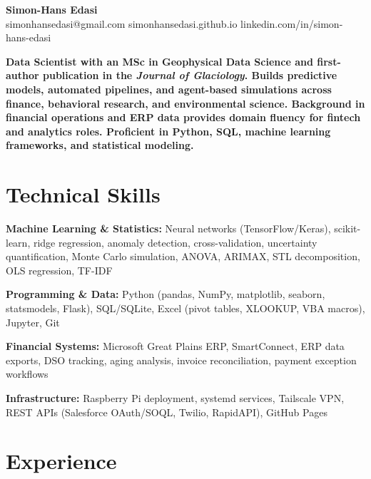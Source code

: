\documentclass[11pt,a4paper]{article}
\begin{document}
\begin{center}
    {\LARGE \textbf{Simon-Hans Edasi}} \\[6pt]
    simonhansedasi@gmail.com \hfill \textbar \hfill
    simonhansedasi.github.io \hfill \textbar \hfill
    linkedin.com/in/simon-hans-edasi
\end{center}

\vspace{0.3cm}

\noindent
\textbf{Data Scientist with an MSc in Geophysical Data Science and first-author publication in the \textit{Journal of Glaciology}. Builds predictive models, automated pipelines, and agent-based simulations across finance, behavioral research, and environmental science. Background in financial operations and ERP data provides domain fluency for fintech and analytics roles. Proficient in Python, SQL, machine learning frameworks, and statistical modeling.}

\section*{Technical Skills}

\noindent
\textbf{Machine Learning \& Statistics:} Neural networks (TensorFlow/Keras), scikit-learn, ridge regression, anomaly detection, cross-validation, uncertainty quantification, Monte Carlo simulation, ANOVA, ARIMAX, STL decomposition, OLS regression, TF-IDF

\noindent
\textbf{Programming \& Data:} Python (pandas, NumPy, matplotlib, seaborn, statsmodels, Flask), SQL/SQLite, Excel (pivot tables, XLOOKUP, VBA macros), Jupyter, Git

\noindent
\textbf{Financial Systems:} Microsoft Great Plains ERP, SmartConnect, ERP data exports, DSO tracking, aging analysis, invoice reconciliation, payment exception workflows

\noindent
\textbf{Infrastructure:} Raspberry Pi deployment, systemd services, Tailscale VPN, REST APIs (Salesforce OAuth/SOQL, Twilio, RapidAPI), GitHub Pages

\section*{Experience}
\end{document}
